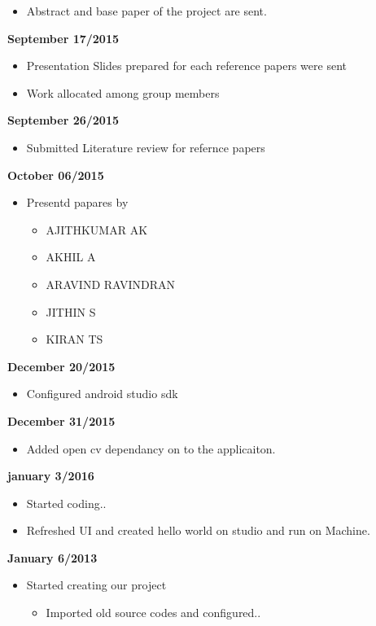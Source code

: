 \documentclass[10pt,a4paper,twoside]{report}
\begin{document}
\begin{appendix}
\begin{flushleft}
\begin{itemize}
\begin{itemize}
\item Abstract and base paper of the project are sent.
\end{itemize}
\end{itemize}
\textbf{September 17/2015}\\
\begin{itemize}
\item Presentation Slides prepared for each reference papers were sent\\

\item Work allocated among group members
\end{itemize}
\textbf{September 26/2015}\\
\begin{itemize}
\item Submitted Literature review for refernce papers
\end{itemize}
\textbf{
October 06/2015}\\
\begin{itemize}
\item Presentd papares by
\begin{itemize}
\item AJITHKUMAR AK
\item AKHIL A
\item ARAVIND RAVINDRAN
\item JITHIN S
\item KIRAN TS
\end{itemize}
\end{itemize}
\textbf{December 20/2015}\\
\begin{itemize}
\item Configured android studio sdk
\end{itemize}
\textbf{December 31/2015}
\begin{itemize}
\item Added open cv dependancy on to the applicaiton.
\end{itemize}
\newpage
\textbf{january 3/2016}
\begin{itemize}
\item Started coding..
\item Refreshed UI and created hello world on studio and run on Machine.

\end{itemize}
\textbf{January 6/2013}
\begin{itemize}
\item Started creating our project
\begin{itemize}
\item Imported old source codes and configured..
\end{itemize}
\end{itemize}


\end{flushleft}
\end{appendix}
\end{document}

